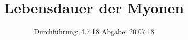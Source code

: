 

\subject{V 01}
\title{Lebensdauer der Myonen}
\date{
  Durchführung: 4.7.18
  \hspace{3em}
  Abgabe: 20.07.18
}



\maketitle
\thispagestyle{empty}
\tableofcontents
\newpage






\printbibliography




